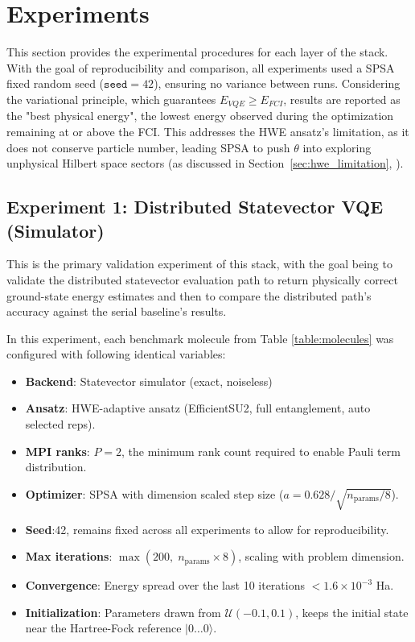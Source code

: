 \section{Experiments}
This section provides the experimental procedures for each layer of the stack. With the goal of reproducibility and comparison, all experiments used a SPSA fixed random seed ($\texttt{seed}=42$), ensuring no variance between runs. 
Considering the variational principle, which guarantees $E_{VQE} \geq E_{FCI}$, results are reported as the "best physical energy", the lowest energy observed during 
the optimization remaining at or above the FCI. This addresses the HWE ansatz's limitation, as it does not conserve particle number, leading SPSA to push $\theta$
into exploring unphysical Hilbert space sectors (as discussed in Section~\ref{sec:hwe_limitation}, \parencite{kandala2017hardware}).

\subsection{Experiment 1: Distributed Statevector VQE (Simulator)}
This is the primary validation experiment of this stack, with the goal being to validate the distributed statevector evaluation path to return 
physically correct ground-state energy estimates and then to compare the distributed path's accuracy against the serial baseline's results.

In this experiment, each benchmark molecule from Table \ref{table:molecules} was configured with following identical variables:

\begin{itemize}
    \item \textbf{Backend}: Statevector simulator (exact, noiseless)  
    \item \textbf{Ansatz}: HWE-adaptive ansatz (EfficientSU2, full entanglement, auto selected reps). 
    \item \textbf{MPI ranks}: $P = 2$, the minimum rank count required to enable Pauli term distribution.
    \item \textbf{Optimizer}: SPSA with dimension scaled step size  ($a= 0.628 / \sqrt{n_{\text{params}} / 8}$). 
    \item \textbf{Seed}:42, remains fixed across all experiments to allow for reproducibility.
    \item \textbf{Max iterations}: $\max(200,\; n_{\text{params}} \times 8)$, scaling with problem dimension. 
    \item \textbf{Convergence}: Energy spread over the last 10 iterations $< 1.6 \times 10^{-3}$  Ha.         
    \item \textbf{Initialization}: Parameters drawn from $\mathcal{U}(-0.1, 0.1)$, keeps the initial state near the Hartree-Fock reference $|0\ldots0\rangle$. 
\end{itemize}   

